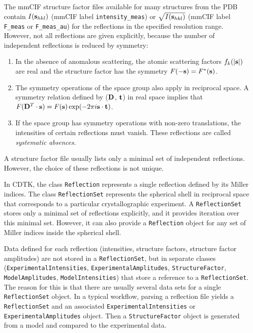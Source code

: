 \documentclass[12pt]{article}
\newcommand{\vect}[1]{{\bf #1}}
\newcommand{\mat}[1]{{\bf #1}}
\newcommand{\vs}{\vect{s}}
\newcommand{\vt}{\vect{t}}
\begin{document}
\begin{sloppy}
The mmCIF structure factor files available for many structures from
the PDB contain $I(\vs_{hkl})$ (mmCIF label \texttt{intensity\_meas})
or $\sqrt{I(\vs_{hkl})}$ (mmCIF label \texttt{F\_meas} or
\texttt{F\_meas\_au}) for the reflections in the specified resolution
range. However, not all reflections are given explicitly, because the
number of independent reflections is reduced by symmetry:
\begin{enumerate}
\item
In the absence of anomalous scattering, the atomic scattering factors
$f_k(|\vs|)$ are real and the structure factor has the symmetry
$F(-\vs) = F^{*}(\vs)$.
\item
The symmetry operations of the space group also apply in reciprocal
space. A symmetry relation defined by ($\mat{D}$, $\vt$) in real space
implies that $F(\mat{D}^T\cdot\vs) = F(\vs) \exp(-2\pi i \vs\cdot\vt)$.
\item
If the space group has symmetry operations with non-zero translations,
the intensities of certain reflections must vanish. These reflections
are called \textit{systematic absences}.
\end{enumerate}
A structure factor file usually lists only a minimal set of
independent reflections. However, the choice of these reflections is
not unique.

\vspace{3mm}

In CDTK, the class \texttt{Reflection} represents a single reflection
defined by its Miller indices. The class \texttt{ReflectionSet}
represents the spherical shell in reciprocal space that corresponds to
a particular crystallographic experiment. A \texttt{ReflectionSet} stores
only a minimal set of reflections explicitly, and it provides iteration
over this minimal set. However, it can also provide a \texttt{Reflection}
object for any set of Miller indices inside the spherical shell.

Data defined for each reflection (intensities, structure factors,
structure factor amplitudes) are not stored in a
\texttt{ReflectionSet}, but in separate classes
(\texttt{ExperimentalIntensities}, \texttt{ExperimentalAmplitudes},
\texttt{StructureFactor}, \texttt{ModelAmplitudes},
\texttt{ModelIntensities}) that store a reference to a
\texttt{ReflectionSet}. The reason for this is that there are usually
several data sets for a single \texttt{ReflectionSet} object. In a
typical workflow, parsing a reflection file yields a
\texttt{ReflectionSet} and an associated
\texttt{ExperimentalIntensities} or \texttt{ExperimentalAmplitudes}
object. Then a \texttt{StructureFactor} object is generated from
a model and compared to the experimental data.


\end{sloppy}
\end{document}
